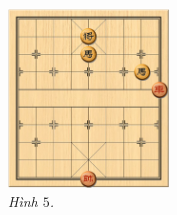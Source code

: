 \begin{multicols}{2}
	\begin{figure}[H]
		\vspace*{-5pt}
		\centering
		\captionsetup{labelformat= empty, justification=centering}
		\includegraphics[width= 0.38\textwidth]{5}
		\caption{\small\textit{\color{gocco}Hình $5$.}}
		\vspace*{-10pt}
	\end{figure}
\end{multicols}




